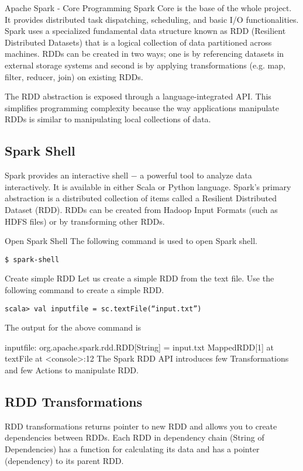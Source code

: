 \documentclass[a4paper,12pt]{article}
\begin{document}
Apache Spark - Core Programming
Spark Core is the base of the whole project. It provides distributed task dispatching, scheduling, and basic I/O functionalities. Spark uses a specialized fundamental data structure known as RDD (Resilient Distributed Datasets) that is a logical collection of data partitioned across machines. RDDs can be created in two ways; one is by referencing datasets in external storage systems and second is by applying transformations (e.g. map, filter, reducer, join) on existing RDDs.

The RDD abstraction is exposed through a language-integrated API. This simplifies programming complexity because the way applications manipulate RDDs is similar to manipulating local collections of data.

\subsection*{Spark Shell}
Spark provides an interactive shell − a powerful tool to analyze data interactively. It is available in either Scala or Python language. Spark’s primary abstraction is a distributed collection of items called a Resilient Distributed Dataset (RDD). RDDs can be created from Hadoop Input Formats (such as HDFS files) or by transforming other RDDs.

Open Spark Shell
The following command is used to open Spark shell.
\begin{verbatim}
$ spark-shell    
\end{verbatim}

Create simple RDD
Let us create a simple RDD from the text file. Use the following command to create a simple RDD.
\begin{verbatim}
scala> val inputfile = sc.textFile(“input.txt”)
\end{verbatim}
The output for the above command is

inputfile: org.apache.spark.rdd.RDD[String] = input.txt MappedRDD[1] at textFile at <console>:12
The Spark RDD API introduces few Transformations and few Actions to manipulate RDD.

\subsection*{RDD Transformations}
RDD transformations returns pointer to new RDD and allows you to create dependencies between RDDs. Each RDD in dependency chain (String of Dependencies) has a function for calculating its data and has a pointer (dependency) to its parent RDD.
\end{document}
